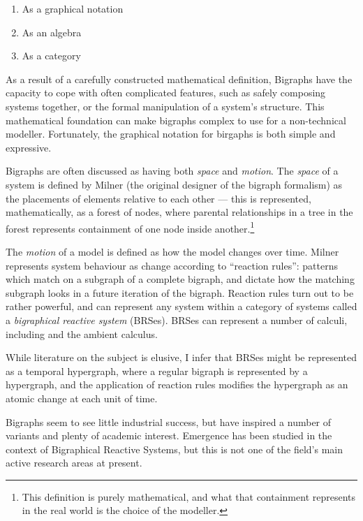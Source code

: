 \documentclass[draft]{article}
\begin{document}
\begin{enumerate}
\item As a graphical notation
\item As an algebra
\item As a category
\end{enumerate}

As a result of a carefully constructed mathematical definition, Bigraphs have
the capacity to cope with often complicated features, such as safely composing
systems together, or the formal manipulation of a system's structure. This
mathematical foundation can make bigraphs complex to use for a non-technical
modeller. Fortunately, the graphical notation for birgaphs is both simple and
expressive.\par

Bigraphs are often discussed as having both \emph{space} and
\emph{motion}\cite{milner2009space}. The \emph{space} of a system is defined by
Milner (the original designer of the bigraph formalism) as the placements of
elements relative to each other --- this is represented, mathematically, as a
forest of nodes, where parental relationships in a tree in the forest represents
containment of one node inside another.\footnote{This definition is purely
  mathematical, and what that containment represents in the real world is the
  choice of the modeller.}\par

The \emph{motion} of a model is defined as how the model changes over time.
Milner represents system behaviour as change according to ``reaction rules'':
patterns which match on a subgraph of a complete bigraph, and dictate how the
matching subgraph looks in a future iteration of the bigraph. Reaction rules
turn out to be rather powerful, and can represent any system within a category
of systems called a \emph{bigraphical reactive
  system}\cite{milner_early_brs_definition} (BRSes). BRSes can represent a
number of calculi, including \picalculus and the ambient
calculus\cite{bigraphs_and_transitions_milner_jensen}.\par

While literature on the
subject is elusive, I infer that BRSes might
be represented as a temporal hypergraph, where a regular bigraph is represented
by a hypergraph, and the application of reaction rules modifies the hypergraph
as an atomic change at each unit of time.\par

Bigraphs seem to see little industrial success, but have inspired a number of
variants\cite{bigraphs_with_sharing,directed_bigraphs} and plenty of academic
interest\cite{impalas_stevegnani,bigraph_model_checking,bigraph_languages}.
Emergence has been studied in the context of Bigraphical Reactive Systems\cite{bigraph_emergence}, but
this is not one of the field's main active research areas at present.
\end{document}
